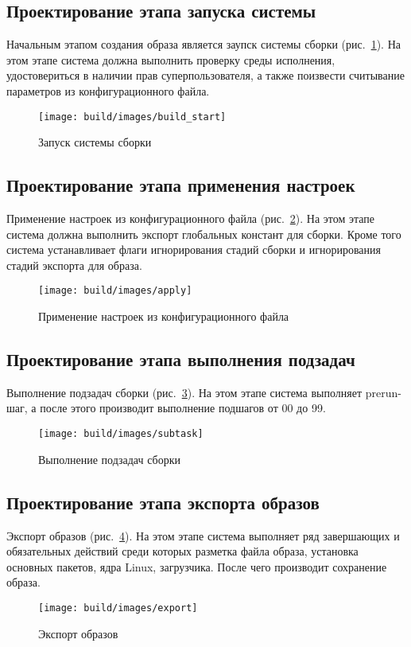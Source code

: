 \newpage
\subsection{Проектирование этапа запуска системы}

Начальным этапом создания образа является заупск системы сборки (рис.~\ref{fig: build_start}).
  На этом этапе система должна выполнить проверку среды исполнения, удостовериться в наличии прав суперпользователя, а также поизвести считывание параметров из конфигурационного файла.
  \begin{figure}[h!]
    \centering
    \setlength{\fboxsep}{5pt}
    \texttt{[image: build/images/build\_start]}
    \caption{Запуск системы сборки}\label{fig: build_start}
  \end{figure}

\newpage
\subsection{Проектирование этапа применения настроек}
Применение настроек из конфигурационного файла (рис.~\ref{fig: apply}). На этом этапе система должна выполнить экспорт глобальных констант для сборки.
Кроме того система устанавливает флаги игнорирования стадий сборки и игнорирования стадий экспорта для образа.
\begin{figure}[h!]
  \centering
  \setlength{\fboxsep}{5pt}
  \texttt{[image: build/images/apply]}
  \caption{Применение настроек из конфигурационного файла}\label{fig: apply}
\end{figure}

\newpage
\subsection{Проектирование этапа выполнения подзадач}
Выполнение подзадач сборки (рис.~\ref{fig: subtask}). На этом этапе система выполняет prerun-шаг, а после этого производит выполнение подшагов от 00 до 99.
\begin{figure}[h!]
  \centering
  \setlength{\fboxsep}{5pt}
  \texttt{[image: build/images/subtask]}
  \caption{Выполнение подзадач сборки}\label{fig: subtask}
\end{figure}

\newpage
\subsection{Проектирование этапа экспорта образов}
Экспорт образов (рис.~\ref{fig: export}). На этом этапе система выполняет ряд завершающих и обязательных действий среди которых разметка файла образа,
установка основных пакетов, ядра Linux, загрузчика. После чего производит сохранение образа.
\begin{figure}[h!]
  \centering
  \setlength{\fboxsep}{5pt}
  \texttt{[image: build/images/export]}
  \caption{Экспорт образов}\label{fig: export}
\end{figure}
\newpage
